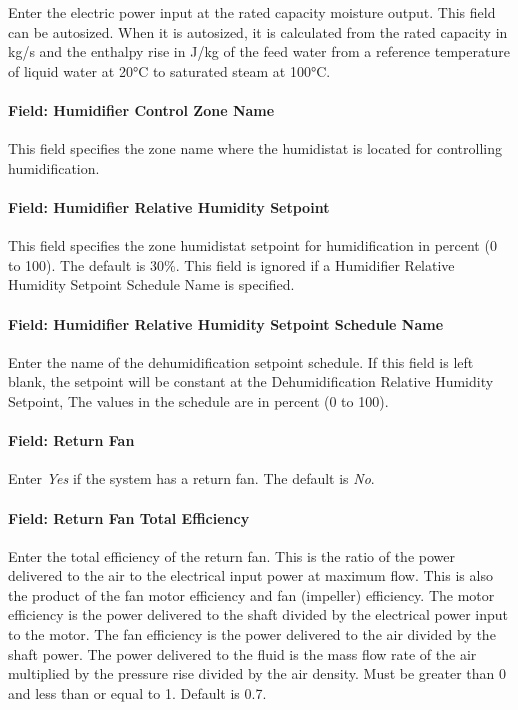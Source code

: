 Enter the electric power input at the rated capacity moisture output. This field can be autosized. When it is autosized, it is calculated from the rated capacity in kg/s and the enthalpy rise in J/kg of the feed water from a reference temperature of liquid water at 20°C to saturated steam at 100°C.

\paragraph{Field: Humidifier Control Zone Name}\label{field-humidifier-control-zone-name-5}

This field specifies the zone name where the humidistat is located for controlling humidification.

\paragraph{Field: Humidifier Relative Humidity Setpoint}\label{field-humidifier-relative-humidity-setpoint-1}

This field specifies the zone humidistat setpoint for humidification in percent (0 to 100). The default is 30\%. This field is ignored if a Humidifier Relative Humidity Setpoint Schedule Name is specified.

\paragraph{Field: Humidifier Relative Humidity Setpoint Schedule Name}\label{field-humidifier-relative-humidity-setpoint-schedule-name-1}

Enter the name of the dehumidification setpoint schedule. If this field is left blank, the setpoint will be constant at the Dehumidification Relative Humidity Setpoint, The values in the schedule are in percent (0 to 100).

\paragraph{Field: Return Fan}\label{field-return-fan-3}

Enter \emph{Yes} if the system has a return fan. The default is \emph{No}.

\paragraph{Field: Return Fan Total Efficiency}\label{field-return-fan-total-efficiency-3}

Enter the total efficiency of the return fan. This is the ratio of the power delivered to the air to the electrical input power at maximum flow. This is also the product of the fan motor efficiency and fan (impeller) efficiency. The motor efficiency is the power delivered to the shaft divided by the electrical power input to the motor. The fan efficiency is the power delivered to the air divided by the shaft power. The power delivered to the fluid is the mass flow rate of the air multiplied by the pressure rise divided by the air density. Must be greater than 0 and less than or equal to 1. Default is 0.7.

